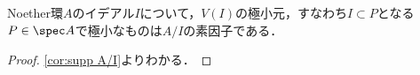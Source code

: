 \begin{cor}
	Noether環$A$のイデアル$I$について，$V(I)$の極小元，すなわち$I\subset P$となる$P\in\spec A$で極小なものは$A/I$の素因子である．
\end{cor}

\begin{proof}
	\ref{cor:supp A/I}よりわかる．
\end{proof}

%
%


